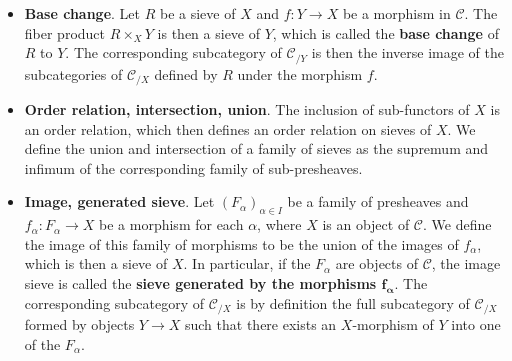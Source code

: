 \begin{itemize}
\item \textbf{Base change}. Let $R$ be a sieve of $X$ and $f:Y\to X$ be a morphism in $\mathcal{C}$. The fiber product $R\times_XY$ is then a sieve of $Y$, which is called the \textbf{base change} of $R$ to $Y$. The corresponding subcategory of $\mathcal{C}_{/Y}$ is then the inverse image of the subcategories of $\mathcal{C}_{/X}$ defined by $R$ under the morphism $f$.
\item \textbf{Order relation, intersection, union}. The inclusion of sub-functors of $X$ is an order relation, which then defines an order relation on sieves of $X$. We define the union and intersection of a family of sieves as the supremum and infimum of the corresponding family of sub-presheaves.
\item \textbf{Image, generated sieve}. Let $(F_\alpha)_{\alpha\in I}$ be a family of presheaves and $f_\alpha:F_\alpha\to X$ be a morphism for each $\alpha$, where $X$ is an object of $\mathcal{C}$. We define the image of this family of morphisms to be the union of the images of $f_\alpha$, which is then a sieve of $X$. In particular, if the $F_\alpha$ are objects of $\mathcal{C}$, the image sieve is called the \textbf{sieve generated by the morphisms $\bm{f_\alpha}$}. The corresponding subcategory of $\mathcal{C}_{/X}$ is by definition the full subcategory of $\mathcal{C}_{/X}$ formed by objects $Y\to X$ such that there exists an $X$-morphism of $Y$ into one of the $F_\alpha$.
\end{itemize}

